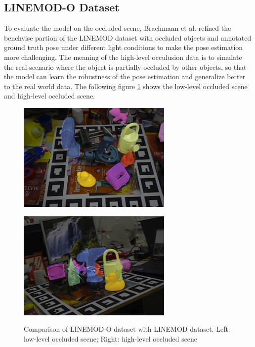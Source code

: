 \documentclass[12pt,DIV14,BCOR12mm,a4paper,footinclude=false,headinclude,parskip=half-,twoside,openright,cleardoublepage=empty,toc=index,bibliography=totoc,listof=totoc]{scrreprt}
\numberwithin{equation}{chapter}
\begin{document}
\subsection{LINEMOD-O Dataset}
To evaluate the model on the occluded scene, Brachmann et al. \cite{dataV4MUMX2020} refined the benchvise partion of the LINEMOD dataset with occluded objects and annotated ground truth pose under different light conditions to make the pose estimation more challenging. The meaning of the high-level occulusion data is to simulate the real scenario where the object is partially occluded by other objects, so that the model can learn the robustness of the pose estimation and generalize better to the real world data. The following figure \ref{img:linemod_o} shows the low-level occluded scene and high-level occluded scene.
\begin{figure}[h]
  \centering
  \begin{minipage}{.5\textwidth}
    \centering
    \includegraphics[scale=.6]{img/nooclu.png}
    \label{img:nooclu}
  \end{minipage}%
  \begin{minipage}{.5\textwidth}
    \centering
    \includegraphics[scale=.6]{img/oclu.png}
    \label{img:oclu}
  \end{minipage}
  \caption{Comparison of LINEMOD-O dataset with LINEMOD dataset. Left: low-level occluded scene; Right: high-level occluded scene}
  \label{img:linemod_o}
\end{figure}
\end{document}
